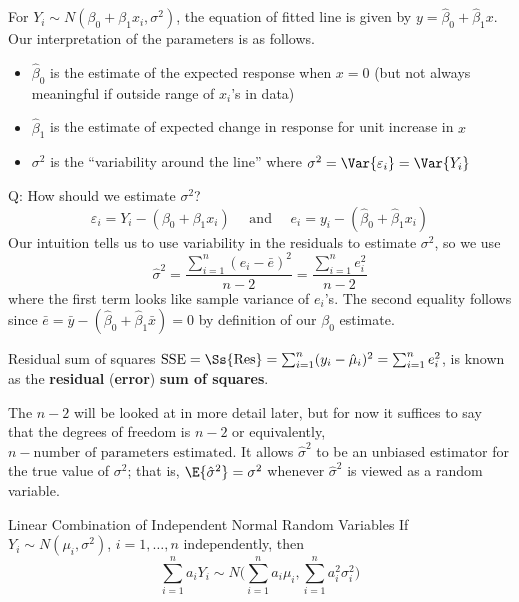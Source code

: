 For $ Y_i \sim N(\beta_0+\beta_1x_i,\sigma^2) $,
the equation of fitted line
is given by $ y=\hat{\beta}_0+\hat{\beta}_1x $. Our
interpretation of the parameters is as follows.
\begin{itemize}
    \item $ \hat{\beta}_0 $ is the estimate
          of the expected response when $ x=0 $ (but not always
          meaningful if outside range of $ x_i $'s in data)
    \item $ \hat{\beta}_1 $ is the estimate of
          expected change in response for unit increase in $ x $
    \item $ \sigma^2 $ is the
          ``variability around the line''
          where $ \sigma^2=\Var{\varepsilon_i}=\Var{Y_i} $
\end{itemize}
Q\@: How should we estimate $ \sigma^2 $?
\[ \varepsilon_i=Y_i-(\beta_0+\beta_1x_i)
    \quad\text{ and }\quad e_i=y_i-(\hat{\beta}_0+\hat{\beta}_1x_i) \]
Our intuition tells us to use variability in the residuals to estimate
$ \sigma^2 $, so we use
\[ \hat{\sigma}^2
    =\frac{\sum_{i=1}^{n} (e_i-\bar{e})^2}{n-2}=
    \frac{\sum_{i=1}^{n} e_i^2}{n-2}  \]
where the first term looks like sample variance of $ e_i $'s.
The second equality follows since
$ \bar{e}=\bar{y}-(\hat{\beta}_0+\hat{\beta}_1\bar{x})=0 $
by definition of our $ \beta_0 $ estimate.
\begin{Definition}{Residual sum of squares}{}
    $ \text{SSE}=\Ss{\text{Res}}=
        \sum_{i=1}^{n} (y_i-\hat{\mu}_i)^2=
        \sum_{i=1}^{n} e_i^2 $,
    is known as the \textbf{residual} (\textbf{error})
    \textbf{sum of squares}.
\end{Definition}
\begin{Remark}{}{}
    The $ n-2 $ will be looked at in more detail later, but for now
    it suffices to say that the degrees of freedom
    is $ n-2 $ or equivalently, $ n- \text{number of parameters
            estimated}$. It allows $ \hat{\sigma}^2 $ to be an unbiased estimator
    for the true value of $ \sigma^2 $; that is,
    $ \E{\hat{\sigma}^2}=\sigma^2 $
    whenever $ \hat{\sigma}^2 $ is viewed as a random variable.
\end{Remark}
\begin{Theorem}{Linear Combination of Independent Normal Random Variables}{}
    If $ Y_i \sim N(\mu_i,\sigma^2) $, $ i=1,\ldots,n $
    independently, then
    \[ \sum_{i=1}^{n} a_i Y_i \sim N
        \biggl( \sum_{i=1}^{n} a_i\mu_i,\sum_{i=1}^{n} a_i^2\sigma_i^2 \biggr) \]
\end{Theorem}
